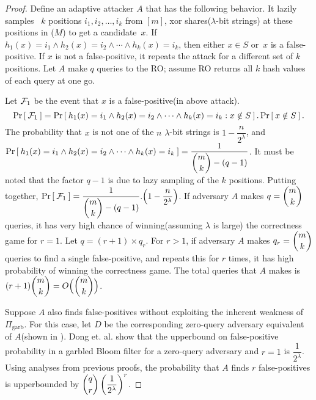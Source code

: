 \begin{proof}%
Define an adaptive attacker $A$ that has the following behavior. It lazily samples ~$k$ positions $i_1,i_2,\ldots,i_k$ from $[m]$, xor shares($\lambda$-bit strings) at these positions in ($M$) to get a candidate~$x$.  If $h_{1}(x)=i_1 \wedge h_2(x)=i_2 \wedge \cdots \wedge h_k(x) = i_k$, then either $x \in S$ or~$x$ is a false-positive. If $x$ is not a false-positive, it repeats the attack for a different set of $k$ positions. Let $A$ make $q$ queries to the RO; assume RO returns all $k$ hash values of each query at one go.

Let ${\cal F}_1$ be the event that $x$ is a false-positive(in above attack).
 $$\Pr\left[\: {\cal F}_1 \:\right] = \Pr\left[\: h_{1}(x)=i_1 \wedge h_2(x)=i_2 \wedge \cdots \wedge h_k(x) = i_k : x \notin S \:\right].\Pr\left[\: x \notin S \:\right].$$
 The probability that $x$ is not one of the $n$ $\lambda$-bit strings is $1-\dfrac{n}{2^\lambda}$, and $ \Pr\left[\: h_{1}(x)=i_1 \wedge h_2(x)=i_2 \wedge \cdots \wedge\\ h_k(x) = i_k \:\right] = \dfrac{1}{\dbinom{m}{k}-(q-1)}$. It must be noted that the factor $q-1$ is due to lazy sampling of the $k$ positions. Putting together, $\Pr\left[\: {\cal F}_1 \:\right] =  \dfrac{1}{\dbinom{m}{k}-(q-1)} . \Big(1-\dfrac{n}{2^\lambda}\Big)$.  If adversary $A$ makes $q = \dbinom{m}{k}$ queries, it has very high chance of winning(assuming $\lambda$ is large) the correctness game for $r=1$.  Let $q = (r+1) \times q_r$. For $r > 1$, if adversary $A$ makes $q_r = \dbinom{m}{k}$ queries to find a single false-positive, and repeats this for $r$ times, it has high probability of winning the correctness game. The total queries that $A$ makes is $(r+1)\dbinom{m}{k} = O\Big(\dbinom{m}{k}\Big)$.

Suppose $A$ also finds false-positives without exploiting the inherent weakness of $\Pi_{\mathrm{garb}}$. For this case, let $D$ be the corresponding  zero-query adversary equivalent of $A$(shown in ). Dong et. al. \cite{dong2013private} show that the upperbound on false-positive probability in a garbled Bloom filter for a zero-query adversary and $r=1$ is $\dfrac{1}{2^\lambda}$.   Using analyses from previous proofs, the probability that $A$ finds $r$ false-positives is upperbounded by  $\dbinom{q}{r}\left(\dfrac{1}{2^\lambda}\right)^r$. 


\end{proof}
